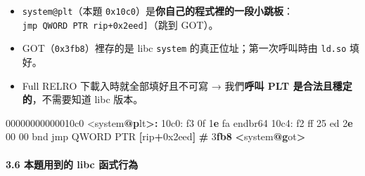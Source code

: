 \documentclass[10pt,a4paper]{article}
\newenvironment{Shaded}{\begin{snugshade}}{\end{snugshade}}
\newcommand{\BaseNTok}[1]{\textcolor[rgb]{0.00,0.00,0.81}{#1}}
\newcommand{\DataTypeTok}[1]{\textcolor[rgb]{0.13,0.29,0.53}{#1}}
\newcommand{\DecValTok}[1]{\textcolor[rgb]{0.00,0.00,0.81}{#1}}
\newcommand{\ErrorTok}[1]{\textcolor[rgb]{0.64,0.00,0.00}{\textbf{#1}}}
\newcommand{\FloatTok}[1]{\textcolor[rgb]{0.00,0.00,0.81}{#1}}
\newcommand{\FunctionTok}[1]{\textcolor[rgb]{0.13,0.29,0.53}{\textbf{#1}}}
\newcommand{\NormalTok}[1]{#1}
\newcommand{\OperatorTok}[1]{\textcolor[rgb]{0.81,0.36,0.00}{\textbf{#1}}}
\renewenvironment{Shaded}{%
  \def\FrameCommand{\fboxsep=3.2pt\colorbox{shadecolor}}%
  \MakeFramed{\advance\hsize-\width\FrameRestore\small}%
}{%
  \endMakeFramed
}
\providecommand{\tightlist}{%
  \setlength{\itemsep}{0pt}\setlength{\parskip}{0pt}}
\begin{document}
\begin{itemize}
\tightlist
\item
  \texttt{system@plt}（本題
  \texttt{0x10c0}）是\textbf{你自己的程式裡的一段小跳板}：\texttt{jmp\ \allowbreak{}QWORD\ \allowbreak{}PTR\ \allowbreak{}{[}rip+0x2eed{]}}（跳到
  GOT）。
\item
  GOT（\texttt{0x3fb8}）裡存的是 libc \texttt{system}
  的真正位址；第一次呼叫時由 \texttt{ld.\allowbreak{}so} 填好。
\item
  Full RELRO 下載入時就全部填好且不可寫 → 我們\textbf{呼叫 PLT
  是合法且穩定的}，不需要知道 libc 版本。
\end{itemize}

\begin{Shaded}
\begin{Highlighting}[]
\NormalTok{00000000000010c0 \textless{}system}\FunctionTok{@}\ErrorTok{p}\NormalTok{lt}\OperatorTok{\textgreater{}:}
\NormalTok{    10c0: f3 }\FloatTok{0}\BaseNTok{f} \DecValTok{1}\ErrorTok{e}\NormalTok{ fa          endbr64}
\NormalTok{    10c4: f2 ff }\DecValTok{25}\NormalTok{ ed }\DecValTok{2}\ErrorTok{e} \DecValTok{00} \DecValTok{00}\NormalTok{ bnd jmp }\DataTypeTok{QWORD} \DataTypeTok{PTR} \OperatorTok{[}\NormalTok{rip}\OperatorTok{+}\BaseNTok{0x2eed}\OperatorTok{]}   \OperatorTok{\#} \DecValTok{3}\ErrorTok{fb8} \OperatorTok{\textless{}}\NormalTok{system}\FunctionTok{@}\ErrorTok{g}\NormalTok{ot}\OperatorTok{\textgreater{}}
\end{Highlighting}
\end{Shaded}

\paragraph{3.6 本題用到的 libc
函式行為}\label{ux672cux984cux7528ux5230ux7684-libc-ux51fdux5f0fux884cux70ba}
\end{document}
